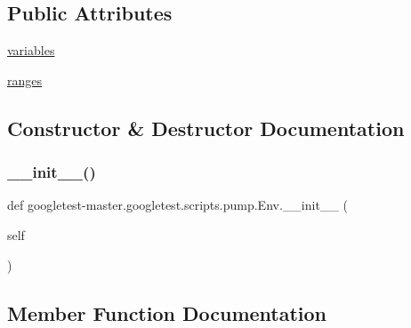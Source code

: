 \subsection*{Public Attributes}
\begin{DoxyCompactItemize}
\item 
\mbox{\hyperlink{classgoogletest-master_1_1googletest_1_1scripts_1_1pump_1_1_env_ab4b8f028f84df234ed81d5c2b57f7303}{variables}}
\item 
\mbox{\hyperlink{classgoogletest-master_1_1googletest_1_1scripts_1_1pump_1_1_env_ad6278f11ab8ac0c0a1520353d5252944}{ranges}}
\end{DoxyCompactItemize}


\subsection{Constructor \& Destructor Documentation}
\mbox{\label{classgoogletest-master_1_1googletest_1_1scripts_1_1pump_1_1_env_a034d5ad21502eb6bcfe43725cc0b684f}} 
\subsubsection{\texorpdfstring{\_\_init\_\_()}{\_\_init\_\_()}}
{\footnotesize\ttfamily def googletest-\/master.\+googletest.\+scripts.\+pump.\+Env.\+\_\+\+\_\+init\+\_\+\+\_\+ (\begin{DoxyParamCaption}\item[{}]{self }\end{DoxyParamCaption})}



\subsection{Member Function Documentation}
\mbox{\label{classgoogletest-master_1_1googletest_1_1scripts_1_1pump_1_1_env_a6bb538e34962d61ba716f98077a4a887}} 
